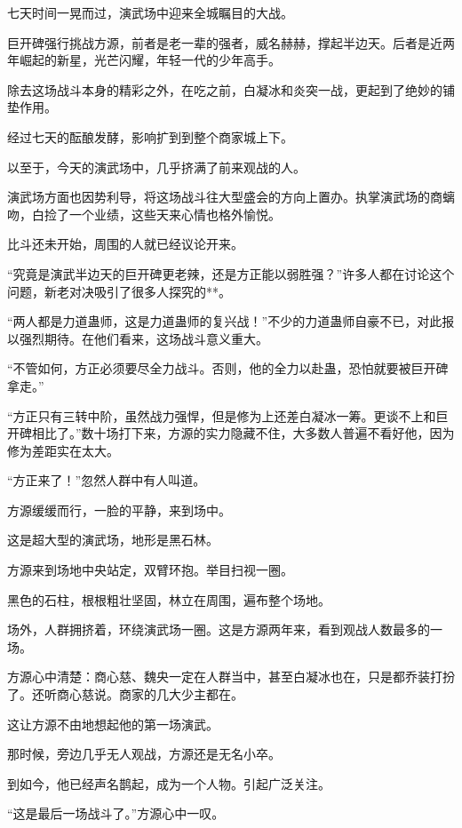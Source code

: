 
\begin{this_body}

七天时间一晃而过，演武场中迎来全城瞩目的大战。

巨开碑强行挑战方源，前者是老一辈的强者，威名赫赫，撑起半边天。后者是近两年崛起的新星，光芒闪耀，年轻一代的少年高手。

除去这场战斗本身的精彩之外，在吃之前，白凝冰和炎突一战，更起到了绝妙的铺垫作用。

经过七天的酝酿发酵，影响扩到到整个商家城上下。

以至于，今天的演武场中，几乎挤满了前来观战的人。

演武场方面也因势利导，将这场战斗往大型盛会的方向上置办。执掌演武场的商螭吻，白捡了一个业绩，这些天来心情也格外愉悦。

比斗还未开始，周围的人就已经议论开来。

“究竟是演武半边天的巨开碑更老辣，还是方正能以弱胜强？”许多人都在讨论这个问题，新老对决吸引了很多人探究的**。

“两人都是力道蛊师，这是力道蛊师的复兴战！”不少的力道蛊师自豪不已，对此报以强烈期待。在他们看来，这场战斗意义重大。

“不管如何，方正必须要尽全力战斗。否则，他的全力以赴蛊，恐怕就要被巨开碑拿走。”

“方正只有三转中阶，虽然战力强悍，但是修为上还差白凝冰一筹。更谈不上和巨开碑相比了。”数十场打下来，方源的实力隐藏不住，大多数人普遍不看好他，因为修为差距实在太大。

“方正来了！”忽然人群中有人叫道。

方源缓缓而行，一脸的平静，来到场中。

这是超大型的演武场，地形是黑石林。

方源来到场地中央站定，双臂环抱。举目扫视一圈。

黑色的石柱，根根粗壮坚固，林立在周围，遍布整个场地。

场外，人群拥挤着，环绕演武场一圈。这是方源两年来，看到观战人数最多的一场。

方源心中清楚：商心慈、魏央一定在人群当中，甚至白凝冰也在，只是都乔装打扮了。还听商心慈说。商家的几大少主都在。

这让方源不由地想起他的第一场演武。

那时候，旁边几乎无人观战，方源还是无名小卒。

到如今，他已经声名鹊起，成为一个人物。引起广泛关注。

“这是最后一场战斗了。”方源心中一叹。


\end{this_body}
